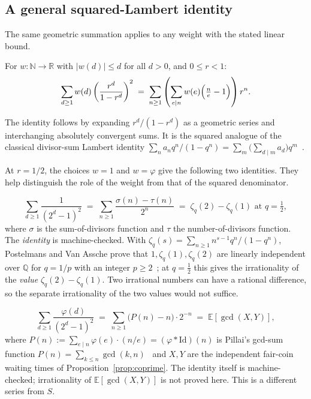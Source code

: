\subsection{A general squared-Lambert identity}
\label{ssec:lambert}

The same geometric summation applies to any weight with the stated
linear bound.

\begin{prop}
\label{prop:lambertengine}
For $w:\mathbb{N}\to\mathbb{R}$ with $|w(d)|\le d$ for all $d>0$, and $0\le r<1$:
\[
\sum_{d\ge1} w(d)\left(\frac{r^d}{1-r^d}\right)^2 \;=\; \sum_{n\ge1}\left(\sum_{e\mid n} w(e)\Bigl(\tfrac{n}{e}-1\Bigr)\right) r^n.
\]
\end{prop}

\noindent The identity follows by expanding $r^d/(1-r^d)$ as a geometric
series and interchanging absolutely convergent sums.  It is the squared
analogue of the classical divisor-sum Lambert identity
$\sum_na_nq^n/(1-q^n)=\sum_m\bigl(\sum_{d\mid m}a_d\bigr)q^m$~\cite[(1),
p.~2]{merca-schmidt}.

At $r=1/2$, the choices $w=1$ and $w=\varphi$ give the following two
identities. They help distinguish the role of the weight from that of the
squared denominator.

\begin{prop}
\label{prop:zetaq}
\[
\sum_{d\ge1} \frac{1}{(2^d-1)^2} \;=\; \sum_{n\ge1} \frac{\sigma(n)-\tau(n)}{2^n} \;=\; \zeta_q(2)-\zeta_q(1) \text{ at } q=\tfrac12,
\]
where $\sigma$ is the sum-of-divisors function and $\tau$ the number-of-divisors
function. The \emph{identity} is machine-checked.  With
$\zeta_q(s)=\sum_{n\ge1}n^{s-1}q^n/(1-q^n)$, Postelmans and Van Assche prove
that $1,\zeta_q(1),\zeta_q(2)$ are linearly independent over $\mathbb{Q}$ for
$q=1/p$ with an integer $p\ge2$~\cite[Theorem~1.3, p.~3]{postelmans-vanassche};
at $q=\tfrac12$ this gives the irrationality of the \emph{value}
$\zeta_q(2)-\zeta_q(1)$.
Two irrational numbers can have a rational difference, so the separate
irrationality of the two values would not suffice.
\end{prop}

\begin{prop}
\label{prop:pillai}
\[
\sum_{d\ge1} \frac{\varphi(d)}{(2^d-1)^2} \;=\; \sum_{n\ge1} \bigl(P(n)-n\bigr)\cdot 2^{-n} \;=\; \mathbb{E}[\gcd(X,Y)],
\]
where $P(n) := \sum_{e\mid n}\varphi(e)\cdot(n/e) = (\varphi * \mathrm{Id})(n)$
is Pillai's gcd-sum function $P(n)=\sum_{k\le n}\gcd(k,n)$~\cite[\S1,
(1)--(2)]{toth-gcd} and $X,Y$ are the independent fair-coin waiting
times of Proposition~\ref{prop:coprime}. The identity itself is
machine-checked; irrationality of $\mathbb{E}[\gcd(X,Y)]$ is not proved here. This is a
different series from $S$.
\end{prop}

